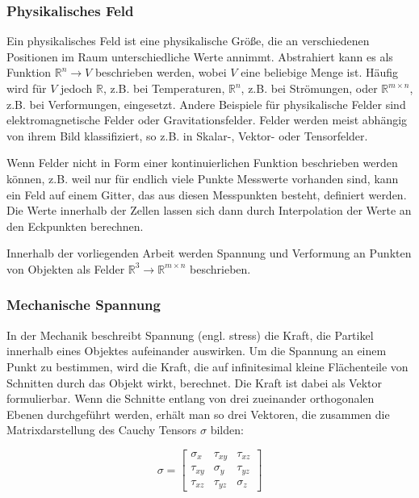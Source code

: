 \documentclass[a4paper,fontsize=12pt,toc=bib,halfparskip]{scrartcl}
\begin{document}
\subsubsection{Physikalisches Feld}
Ein physikalisches Feld ist eine physikalische Gr\"o{\ss}e, die an verschiedenen Positionen im Raum unterschiedliche Werte annimmt\cite[1–2 Electric and magnetic fields]{feynman2011feynman}. Abstrahiert kann es als Funktion $\mathbb{R}^n \rightarrow V$ beschrieben werden, wobei $V$ eine beliebige Menge ist. H\"aufig wird f\"ur $V$ jedoch $\mathbb{R}$, z.B. bei Temperaturen, $\mathbb{R}^n$, z.B. bei Str\"omungen, oder $\mathbb{R}^{m\times n}$, z.B. bei Verformungen, eingesetzt. Andere Beispiele f\"ur physikalische Felder sind elektromagnetische Felder oder Gravitationsfelder. Felder werden meist abh\"angig von ihrem Bild klassifiziert, so z.B. in Skalar-, Vektor- oder Tensorfelder.

Wenn Felder nicht in Form einer kontinuierlichen Funktion beschrieben werden k\"onnen, z.B. weil nur f\"ur endlich viele Punkte Messwerte vorhanden sind, kann ein Feld auf einem Gitter, das aus diesen Messpunkten besteht, definiert werden. Die Werte innerhalb der Zellen lassen sich dann durch Interpolation der Werte an den Eckpunkten berechnen.


Innerhalb der vorliegenden Arbeit werden Spannung und Verformung an Punkten von Objekten als Felder $\mathbb{R}^3 \rightarrow \mathbb{R}^{m\times n}$ beschrieben.


\subsubsection{Mechanische Spannung}
In der Mechanik beschreibt Spannung (engl. stress) die Kraft, die Partikel innerhalb eines Objektes aufeinander auswirken. Um die Spannung an einem Punkt zu bestimmen, wird die Kraft, die auf infinitesimal kleine Fl\"achenteile von Schnitten durch das Objekt wirkt, berechnet. Die Kraft ist dabei als Vektor formulierbar. Wenn die Schnitte entlang von drei zueinander orthogonalen Ebenen durchgef\"uhrt werden, erh\"alt man so drei Vektoren, die zusammen die Matrixdarstellung des Cauchy Tensors $\sigma$ bilden:

\begin{equation}
	\sigma =  
	\begin{bmatrix}
		\sigma_x & \tau_{xy} & \tau_{xz}\\
		\tau_{xy} & \sigma_y & \tau_{yz}\\
		\tau_{xz} & \tau_{yz} & \sigma_z
	\end{bmatrix}
\end{equation}
\end{document}
